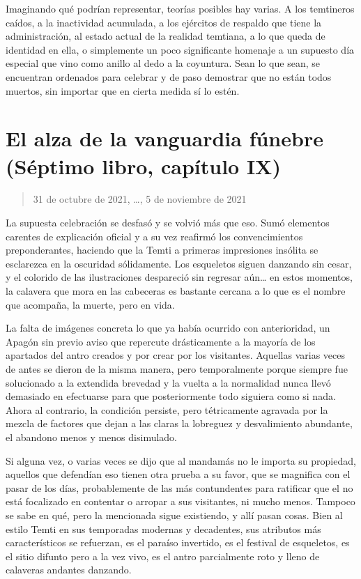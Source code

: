 \documentclass[
]{book}
\begin{document}
Imaginando qué podrían representar, teorías posibles hay varias. A los temtineros caídos, a la inactividad acumulada, a los ejércitos de respaldo que tiene la administración, al estado actual de la realidad temtiana, a lo que queda de identidad en ella, o simplemente un poco significante homenaje a un supuesto día especial que vino como anillo al dedo a la coyuntura. Sean lo que sean, se encuentran ordenados para celebrar y de paso demostrar que no están todos muertos, sin importar que en cierta medida sí lo estén.

\hypertarget{el-alza-de-la-vanguardia-fuxfanebre-suxe9ptimo-libro-capuxedtulo-ix}{%
\section{El alza de la vanguardia fúnebre (Séptimo libro, capítulo IX)}\label{el-alza-de-la-vanguardia-fuxfanebre-suxe9ptimo-libro-capuxedtulo-ix}}

\begin{quote}
31 de octubre de 2021, \ldots, 5 de noviembre de 2021
\end{quote}

La supuesta celebración se desfasó y se volvió más que eso. Sumó elementos carentes de explicación oficial y a su vez reafirmó los convencimientos preponderantes, haciendo que la Temti a primeras impresiones insólita se esclarezca en la oscuridad sólidamente. Los esqueletos siguen danzando sin cesar, y el colorido de las ilustraciones despareció sin regresar aún\ldots{} en estos momentos, la calavera que mora en las cabeceras es bastante cercana a lo que es el nombre que acompaña, la muerte, pero en vida.

La falta de imágenes concreta lo que ya había ocurrido con anterioridad, un Apagón sin previo aviso que repercute drásticamente a la mayoría de los apartados del antro creados y por crear por los visitantes. Aquellas varias veces de antes se dieron de la misma manera, pero temporalmente porque siempre fue solucionado a la extendida brevedad y la vuelta a la normalidad nunca llevó demasiado en efectuarse para que posteriormente todo siguiera como si nada. Ahora al contrario, la condición persiste, pero tétricamente agravada por la mezcla de factores que dejan a las claras la lobreguez y desvalimiento abundante, el abandono menos y menos disimulado.

Si alguna vez, o varias veces se dijo que al mandamás no le importa su propiedad, aquellos que defendían eso tienen otra prueba a su favor, que se magnifica con el pasar de los días, probablemente de las más contundentes para ratificar que el no está focalizado en contentar o arropar a sus visitantes, ni mucho menos. Tampoco se sabe en qué, pero la mencionada sigue existiendo, y allí pasan cosas. Bien al estilo Temti en sus temporadas modernas y decadentes, sus atributos más característicos se refuerzan, es el paraíso invertido, es el festival de esqueletos, es el sitio difunto pero a la vez vivo, es el antro parcialmente roto y lleno de calaveras andantes danzando.
\end{document}
